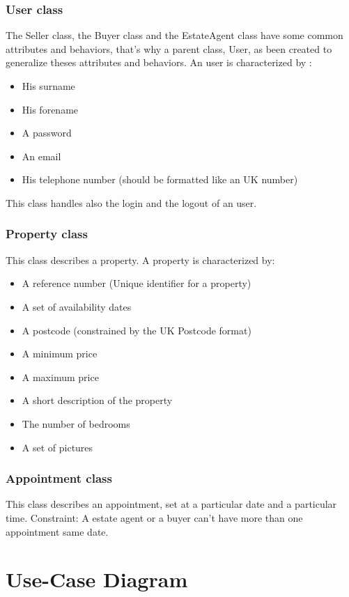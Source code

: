 \documentclass[a4paper,12pt]{article}
\begin{document}
\subsubsection{User class}
The Seller class, the Buyer class and the EstateAgent class have some common attributes and behaviors,
that's why a parent class, User, as been created to generalize theses attributes and behaviors.
An user is characterized by :
\begin{itemize}
\item His surname
\item His forename
\item A password
\item An email
\item His telephone number (should be formatted like an UK number)
\end{itemize}
This class handles also the login and the logout of an user.

\subsubsection{Property class}
This class describes a property. A property is characterized by: 
\begin{itemize}
\item A reference number (Unique identifier for a property)
\item A set of availability dates
\item A postcode (constrained by the UK Postcode format)
\item A minimum price
\item A maximum price
\item A short description of the property
\item The number of bedrooms
\item A set of pictures
\end{itemize}

\subsubsection{Appointment class}
This class describes an appointment, set at a particular date and a particular time.
Constraint: A estate agent or a buyer can't have more than one appointment same date.



\section{Use-Case Diagram}
\end{document}
